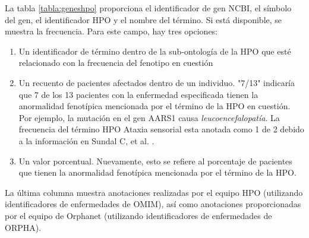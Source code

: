 \renewcommand{\arraystretch}{1.5} %

\begin{table}[h!]
	\centering
	\caption{Cabecera del archivo de HPO asociados}
	\label{tabla:geneshpo}
\end{table}

La tabla \ref{tabla:geneshpo} proporciona el identificador de gen NCBI, el símbolo del gen, el identificador HPO y el nombre del término. Si está disponible, se muestra la frecuencia. Para este campo, hay tres opciones:

\begin{enumerate}
	\item Un identificador de término dentro de la sub-ontología de la HPO que esté relacionado con la frecuencia del fenotipo en cuestión
	\item Un recuento de pacientes afectados dentro de un individuo. "7/13" indicaría que 7 de los 13 pacientes con la enfermedad especificada tienen la anormalidad fenotípica mencionada por el término de la HPO en cuestión. Por ejemplo, la mutación en el gen AARS1 causa \textit{leucoencefalopatía}. La frecuencia del término HPO Ataxia sensorial esta anotada como 1 de 2 debido a la información en Sundal C, et al. \cite{Sundal2019}. 
	\item Un valor porcentual. Nuevamente, esto se refiere al porcentaje de pacientes que tienen la anormalidad fenotípica mencionada por el término de la HPO.
\end{enumerate}

La última columna muestra anotaciones realizadas por el equipo HPO (utilizando identificadores de enfermedades de OMIM), así como anotaciones proporcionadas por el equipo de Orphanet \cite{Orphanet2008} (utilizando identificadores de enfermedades de ORPHA).

